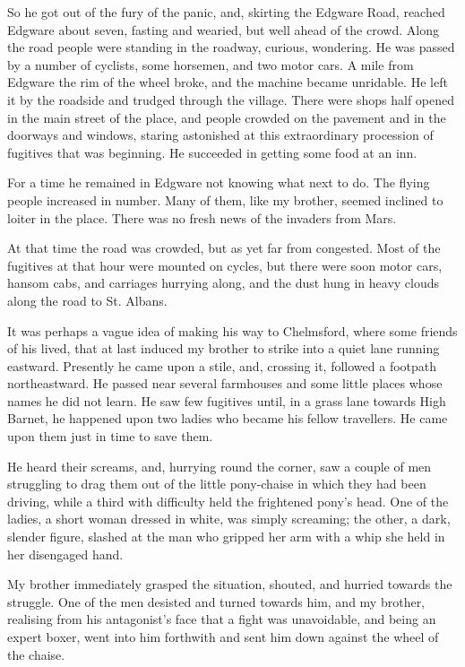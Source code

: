 So he got out of the fury of the panic, and, skirting the Edgware
Road, reached Edgware about seven, fasting and wearied, but well
ahead of the crowd. Along the road people were standing in the
roadway, curious, wondering. He was passed by a number of cyclists,
some horsemen, and two motor cars. A mile from Edgware the rim of
the wheel broke, and the machine became unridable. He left it by
the roadside and trudged through the village. There were shops half
opened in the main street of the place, and people crowded on the
pavement and in the doorways and windows, staring astonished at
this extraordinary procession of fugitives that was beginning. He
succeeded in getting some food at an inn.

For a time he remained in Edgware not knowing what next to do. The
flying people increased in number. Many of them, like my brother,
seemed inclined to loiter in the place. There was no fresh news of
the invaders from Mars.

At that time the road was crowded, but as yet far from congested.
Most of the fugitives at that hour were mounted on cycles, but
there were soon motor cars, hansom cabs, and carriages hurrying
along, and the dust hung in heavy clouds along the road to St.
Albans.

It was perhaps a vague idea of making his way to Chelmsford, where
some friends of his lived, that at last induced my brother to
strike into a quiet lane running eastward. Presently he came upon a
stile, and, crossing it, followed a footpath northeastward. He
passed near several farmhouses and some little places whose names
he did not learn. He saw few fugitives until, in a grass lane
towards High Barnet, he happened upon two ladies who became his
fellow travellers. He came upon them just in time to save them.

He heard their screams, and, hurrying round the corner, saw a
couple of men struggling to drag them out of the little pony-chaise
in which they had been driving, while a third with difficulty held
the frightened pony's head. One of the ladies, a short woman
dressed in white, was simply screaming; the other, a dark, slender
figure, slashed at the man who gripped her arm with a whip she held
in her disengaged hand.

My brother immediately grasped the situation, shouted, and hurried
towards the struggle. One of the men desisted and turned towards
him, and my brother, realising from his antagonist's face that a
fight was unavoidable, and being an expert boxer, went into him
forthwith and sent him down against the wheel of the chaise.

